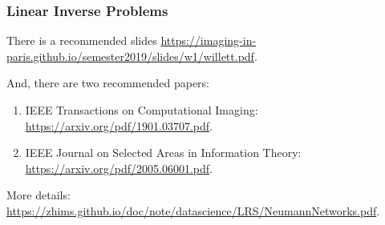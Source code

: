 \documentclass[aspectratio=2516]{beamer}
\begin{document}
\begin{frame}
\frametitle{Linear Inverse Problems \uppercase\expandafter{}}

{\tiny There is a recommended slides {\color{blue} \url{https://imaging-in-paris.github.io/semester2019/slides/w1/willett.pdf}}}.

\vspace{0.5cm}

{\tiny And, there are two  recommended papers: 
	
	\vspace{0.25cm}
	
	\begin{enumerate}
		\item IEEE Transactions on Computational Imaging:  {\color{blue} \url{https://arxiv.org/pdf/1901.03707.pdf}}.
		
		\vspace{0.5cm}
		
		\item IEEE Journal on Selected Areas in Information Theory: {\color{blue} \url{https://arxiv.org/pdf/2005.06001.pdf}}.
	\end{enumerate}
}

\vspace{0.5cm}

{\tiny More details:} {\color{blue} \tiny \url{https://zhims.github.io/doc/note/datascience/LRS/NeumannNetworks.pdf}}.


\end{frame}
\end{document}
